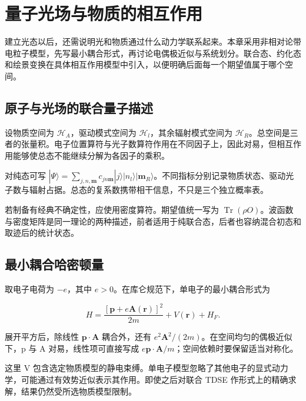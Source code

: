 \documentclass[UTF8,a4paper,zihao=-4,openany,fontset=fandol]{ctexbook}
\begin{document}
\chapter{量子光场与物质的相互作用}\label{ch:03}


建立光态以后，还需说明光和物质通过什么动力学联系起来。本章采用非相对论带电粒子模型，先写最小耦合形式，再讨论电偶极近似与系统划分。联合态、约化态和绘景变换在具体相互作用模型中引入，以便明确后面每一个期望值属于哪个空间。



\section{原子与光场的联合量子描述}\label{sec:03:1}


设物质空间为 $\mathcal H_A$，驱动模式空间为 $\mathcal H_l$，其余辐射模式空间为 $\mathcal H_R$。总空间是三者的张量积。电子位置算符与光子数算符作用在不同因子上，因此对易，但相互作用能够使总态不能继续分解为各因子的乘积。



对纯态可写 $|\Psi\rangle=\sum_{j,n,\mathbf m}c_{j n\mathbf m}|j\rangle|n_l\rangle|\mathbf m_R\rangle$。不同指标分别记录物质状态、驱动光子数与辐射占据。总态的复系数携带相干信息，不只是三个独立概率表。



若制备有经典不确定性，应使用密度算符。期望值统一写为 $\operatorname{Tr}(\rho O)$。波函数与密度矩阵是同一理论的两种描述，前者适用于纯联合态，后者也容纳混合初态和取迹后的统计状态。



\section{最小耦合哈密顿量}\label{sec:03:2}


取电子电荷为 $-e$，其中 $e>0$。在库仑规范下，单电子的最小耦合形式为



\begin{equation*}
H=\frac{[\mathbf p+e\mathbf A(\mathbf r)]^2}{2m}
+V(\mathbf r)+H_F.
\tag{3.1}\label{eq:3.1}
\end{equation*}


展开平方后，除线性 $\mathbf p\cdot\mathbf A$ 耦合外，还有 $e^2\mathbf A^2/(2m)$。在空间均匀的偶极近似下，p 与 A 对易，线性项可直接写成 $e\mathbf p\cdot\mathbf A/m$；空间依赖时要保留适当对称化。



这里 V 包含选定物质模型的静电束缚。单电子模型忽略了其他电子的显式动力学，可能通过有效势近似表示其作用。即使之后对联合 TDSE 作形式上的精确求解，结果仍然受所选物质模型限制。
\end{document}
